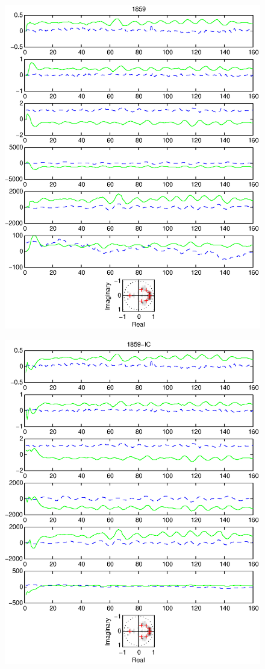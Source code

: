 \documentclass{article}
\begin{document}
\begin{figure}[htb!]\centering
\includegraphics{1859.eps}
\end{figure}\clearpage
\begin{figure}[htb!]\centering
\includegraphics{1859_ic.eps}
\end{figure}\clearpage
\end{document}
